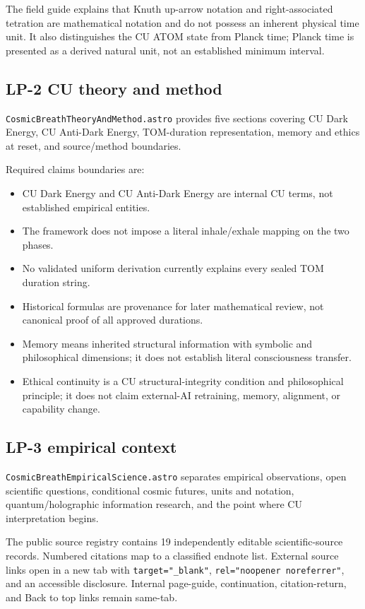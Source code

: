 \documentclass[11pt,letterpaper]{article}
\newcommand{\filepath}[1]{\nolinkurl{#1}}
\begin{document}
The field guide explains that Knuth up-arrow notation and right-associated
tetration are mathematical notation and do not possess an inherent physical
time unit. It also distinguishes the CU ATOM state from Planck time; Planck time
is presented as a derived natural unit, not an established minimum interval.

\subsection{LP-2 CU theory and method}

\filepath{CosmicBreathTheoryAndMethod.astro} provides five sections covering CU
Dark Energy, CU Anti-Dark Energy, TOM-duration representation, memory and ethics
at reset, and source/method boundaries.

Required claims boundaries are:

\begin{itemize}
    \item CU Dark Energy and CU Anti-Dark Energy are internal CU terms, not established empirical entities.
    \item The framework does not impose a literal inhale/exhale mapping on the two phases.
    \item No validated uniform derivation currently explains every sealed TOM duration string.
    \item Historical formulas are provenance for later mathematical review, not canonical proof of all approved durations.
    \item Memory means inherited structural information with symbolic and philosophical dimensions; it does not establish literal consciousness transfer.
    \item Ethical continuity is a CU structural-integrity condition and philosophical principle; it does not claim external-AI retraining, memory, alignment, or capability change.
\end{itemize}

\subsection{LP-3 empirical context}

\filepath{CosmicBreathEmpiricalScience.astro} separates empirical observations,
open scientific questions, conditional cosmic futures, units and notation,
quantum/holographic information research, and the point where CU interpretation
begins.

The public source registry contains 19 independently editable scientific-source
records. Numbered citations map to a classified endnote list. External source
links open in a new tab with \texttt{target="\_blank"},
\texttt{rel="noopener noreferrer"}, and an accessible disclosure. Internal
page-guide, continuation, citation-return, and Back to top links remain same-tab.
\end{document}

